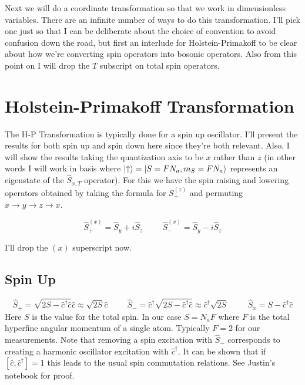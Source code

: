 \documentclass[12pt]{article}
\begin{document}
Next we will do a coordinate transformation so that we work in dimensionless variables. There are an infinite number of ways to do this transformation. I'll pick one just so that I can be deliberate about the choice of convention to avoid confusion down the road, but first an interlude for Holstein-Primakoff to be clear about how we're converting spin operators into bosonic operators. Also from this point on I will drop the $T$ subscript on total spin operators.

\section{Holstein-Primakoff Transformation}
The H-P Transformation is typically done for a spin up oscillator. I'll present the results for both spin up and spin down here since they're both relevant. Also, I will show the results taking the quantization axis to be $x$ rather than $z$ (in other words I will work in basis where $\ket{\uparrow}=\ket{S=F N_a,m_S=F N_a}$ represents an eigenstate of the $\hat{S}_{x,T}$ operator).
For this we have the spin raising and lowering operators obtained by taking the formula for $S_+^{(z)}$ and permuting $x\rightarrow y \rightarrow z \rightarrow x$.

\begin{equation}
\hat{S}_+^{(x)} = \hat{S}_y + i \hat{S}_z \hspace{1cm}
\hat{S}_-^{(x)} = \hat{S}_y - i \hat{S}_z
\end{equation}

I'll drop the $(x)$ superscript now.
\subsection{Spin Up}
\begin{equation}
\hat{S}_+ = \sqrt{2S - \hat{c}^{\dag} \hat{c}} \hat{c} \approx \sqrt{2S} \hat{c} \hspace{1cm}
\hat{S}_- = \hat{c}^{\dag} \sqrt{2S - \hat{c}^{\dag} \hat{c}} \approx \hat{c}^{\dag} \sqrt{2S} \hspace{1cm} \hat{S}_x = S- \hat{c}^{\dag} \hat{c}
\end{equation}
Here $S$ is the value for the total spin. In our case $S = N_a F$ where $F$ is the total hyperfine angular momentum of a single atom. Typically $F=2$ for our measurements. Note that removing a spin excitation with $\hat{S}_-$ corresponds to creating a harmonic oscillator excitation with $\hat{c}^{\dag}$. It can be shown that if $[\hat{c}, \hat{c}^{\dag}]=1$ this leads to the usual spin commutation relations. See Justin's notebook for proof.
\end{document}
